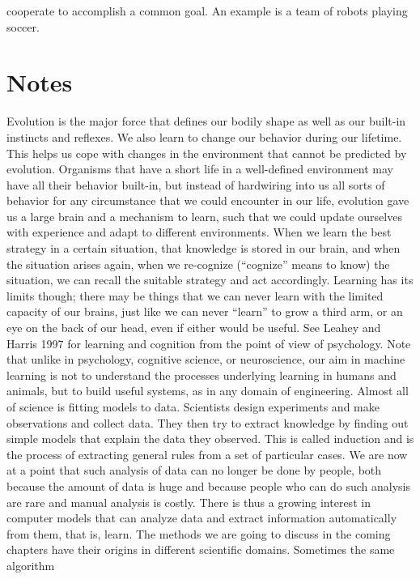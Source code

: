 cooperate to accomplish a common goal. An example is a team of robots playing soccer.

\section{Notes}

Evolution is the major force that defines our bodily shape as well as our built-in instincts and reflexes. We also learn to change our behavior during our lifetime. This helps us cope with changes in the environment that cannot be predicted by evolution. Organisms that have a short life in a well-defined environment may have all their behavior built-in, but instead of hardwiring into us all sorts of behavior for any circumstance that we could encounter in our life, evolution gave us a large brain and a mechanism to learn, such that we could update ourselves with experience and adapt to different environments. When we learn the best strategy in a certain situation, that knowledge is stored in our brain, and when the situation arises again, when we re-cognize (“cognize” means to know) the situation, we can recall the suitable strategy and act accordingly. Learning has its limits though; there may be things that we can never learn with the limited capacity of our brains, just like we can never “learn” to grow a third arm, or an eye on the back of our head, even if either would be useful. See Leahey and Harris 1997 for learning and cognition from the point of view of psychology. Note that unlike in psychology, cognitive science, or neuroscience, our aim in machine learning is not to understand the processes underlying learning in humans and animals, but to build useful systems, as in any domain of engineering. Almost all of science is fitting models to data. Scientists design experiments and make observations and collect data. They then try to extract knowledge by finding out simple models that explain the data they observed. This is called induction and is the process of extracting general rules from a set of particular cases. We are now at a point that such analysis of data can no longer be done by people, both because the amount of data is huge and because people who can do such analysis are rare and manual analysis is costly. There is thus a growing interest in computer models that can analyze data and extract information automatically from them, that is, learn. The methods we are going to discuss in the coming chapters have their origins in different scientific domains. Sometimes the same algorithm

